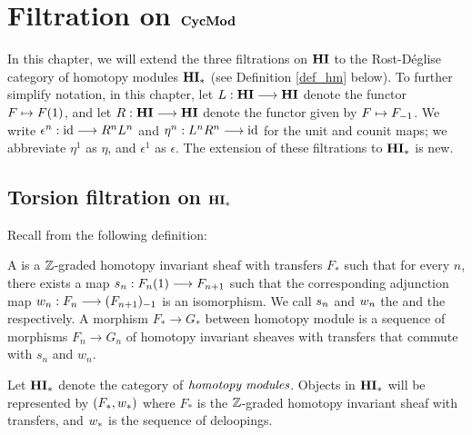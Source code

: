 \newpage
\chapter{Filtration on $\mathbf{CycMod}$}\label{sect_filtration_cycmod}

In this chapter, we will extend the three filtrations on
$\mathbf{HI}$ to the Rost-D\'eglise category of homotopy modules $\mathbf{HI}_*$ 
(see Definition \ref{def_hm} below). To further simplify notation, 
in this chapter, let $L: \mathbf{HI} \longrightarrow \mathbf{HI}$ denote the functor $F 
\mapsto F(1)$, and let $R: \mathbf{HI} \longrightarrow \mathbf{HI}$ denote the functor 
given by $F \mapsto F_{-1}$. We write $\epsilon^n : \mathrm{id} \longrightarrow 
R^nL^n$ and $\eta^n: L^nR^n \longrightarrow \mathrm{id}$ for the unit and counit maps; 
we abbreviate $\eta^1$ as $\eta$, and $\epsilon^1$ as $\epsilon$.
The extension of these filtrations to $\mathbf{HI}_*$ is new.

\section{Torsion filtration on $\mathbf{HI}_*$}
\label{sect_torsion_filt_HM}

Recall from \cite[1.17]{DegModHom} the following definition:

\begin{defn}\label{def_hm}
A  is a $\mathbb{Z}$-graded homotopy 
invariant sheaf with transfers $F_*$ such that for every $n$, 
there exists a map $s_n: F_n(1) \longrightarrow F_{n+1}$ such that the 
corresponding adjunction map $w_n: F_n \longrightarrow (F_{n+1})_{-1}$
is an isomorphism. We call $s_n$ and $w_n$ 
the  and the  
respectively. A morphism $F_* \to G_*$ between homotopy module
is a sequence of morphisms $F_n \to G_n$ of homotopy invariant
sheaves with transfers that commute with $s_n$ and $w_n$.

Let $\mathbf{HI}_*$ denote the category of $\emph{homotopy modules}$.
Objects in $\mathbf{HI}_*$ will be represented by $(F_*, w_*)$ where 
$F_*$ is the $\mathbb{Z}$-graded homotopy invariant sheaf with transfers, 
and $w_*$ is the sequence of deloopings.
\end{defn}

